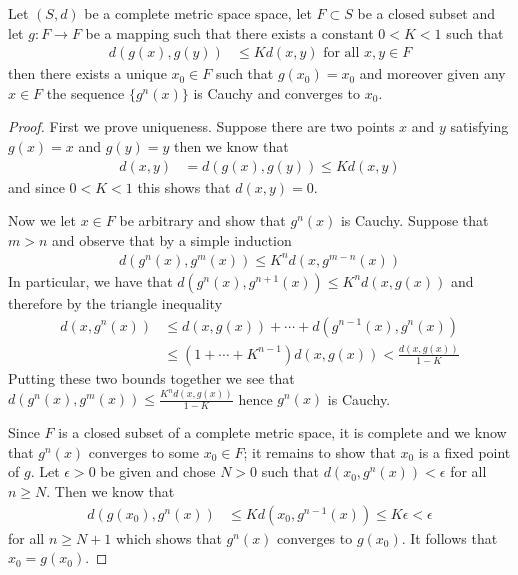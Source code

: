 \begin{prop}\label{ContractionMappingPrinciple}Let $(S,d)$ be a complete
  metric space
  space, let $F \subset S$ be a closed subset and let $g : F \to F$ be
  a mapping such that there exists a constant $0 < K < 1$ such that 
\begin{align*}
d(g(x), g(y)) &\leq K d(x,y) \text{ for all $x,y \in F$}
\end{align*}
then there exists a unique $x_0 \in F$ such that $g(x_0) = x_0$ and
moreover given any $x \in F$ the sequence $\lbrace g^n(x) \rbrace$ is
Cauchy and converges to $x_0$.
\end{prop}
\begin{proof}
First we prove uniqueness.  Suppose there are two points $x$ and $y$
satisfying $g(x) = x$ and $g(y) = y$ then we know that
\begin{align*}
d(x,y) &= d(g(x), g(y)) \leq K d(x,y)
\end{align*}
and since $0 < K < 1$ this shows that $d(x,y) = 0$.

Now we let $x \in F$ be arbitrary and show that $g^n(x)$ is Cauchy.
Suppose that $m > n$ and observe that by a simple induction
\begin{align*}
d(g^n(x), g^m(x)) \leq K^n d(x, g^{m-n}(x))
\end{align*}
In particular, we have that $d(g^n(x), g^{n+1}(x)) \leq K^n d(x,g(x))$
and therefore by the triangle inequality 
\begin{align*}
d(x, g^n(x)) &\leq d(x, g(x)) + \dotsm + d(g^{n-1}(x), g^n(x)) \\
&\leq (1 + \dotsm + K^{n-1}) d(x,g(x)) < \frac{d(x,g(x))}{1-K}
\end{align*}
Putting these two bounds together we see that $d(g^n(x), g^m(x)) \leq  \frac{K^n
  d(x,g(x))}{1-K}$ hence $g^n(x)$ is Cauchy.  

Since $F$ is
a closed subset of a complete metric space, it is 
complete and we know that $g^n(x)$ converges to some $x_0 \in F$; it remains to show that $x_0$
is a fixed point of $g$.  Let $\epsilon > 0$ be given and chose $N >
0$ such that $d(x_0, g^n(x)) < \epsilon$ for all $n \geq N$.  Then we
know that 
\begin{align*}
d(g(x_0), g^n(x)) &\leq K d(x_0, g^{n-1}(x)) \leq K\epsilon < \epsilon
\end{align*}
for all $n \geq N+1$ which shows that $g^n(x)$ converges to $g(x_0)$.  It
follows that $x_0 = g(x_0)$.
\end{proof}

